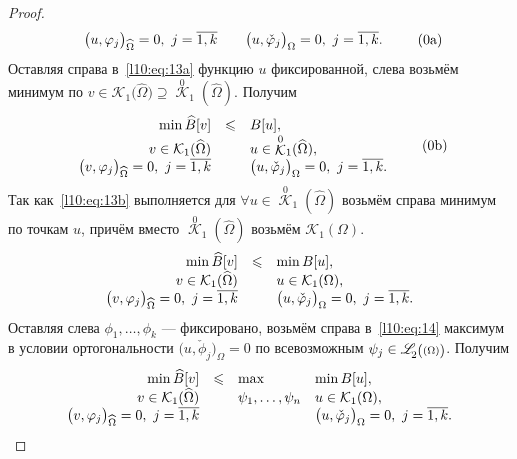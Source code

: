 \documentclass[12pt,a4paper,openany,fleqn]{book}
\newcommand{\mc}[1]{\ensuremath{\mathcal{#1}}}
\newcommand{\K}{\mc{K}}
\newcommand{\fLr}[1][{[a,b];\rho}]{\ensuremath{\mathscr{L}\hspace*{-0.11 cm}{\mathstrut}_{2}{\scriptstyle\left(\vphantom{A^b}#1\right)}}}
\theoremstyle{definition}
\begin{document}
\begin{proof}
\begin{equation}
\begin{array}{rcl}
				\big(u,\phi_j\big)_{\widehat{\Omega}}=0,\ j=\overline{1,k}&  &\big(u,\check{\phi}_j\big)_{\Omega}=0,\ j=\overline{1,k}.
			\end{array}\tag{\theequation a}\hfill
		\end{equation} 
		Оставляя справа в~\eqref{l10:eq:13a} функцию $u$ фиксированной, слева возьмём минимум по $v\in\K_1\big(\widehat{\Omega}\big)\supseteq{\mathop{\K}\limits^0}_1(\widehat{\Omega})$. Получим
		\begin{equation}\label{l10:eq:13b}
			\hfill\begin{array}{rcl}
				\min\widehat{B}[v]&\leqslant&B[u],\\
				v\in\K_1(\widehat{\Omega})& &u\in{\mathop{\K}\limits^0}_1(\widehat{\Omega}),\\
				\big(v,\phi_j\big)_{\widehat{\Omega}}=0,\ j=\overline{1,k}&  &\big(u,\check{\phi}_j\big)_{\Omega}=0,\ j=\overline{1,k}.
			\end{array}\tag{\theequation b}\hfill
		\end{equation} 
		Так как~\eqref{l10:eq:13b} выполняется для $\forall u\in{\mathop{\K}\limits^0}_1(\widehat{\Omega})$ возьмём справа минимум по точкам $u$, причём вместо ${\mathop{\K}\limits^0}_1(\widehat{\Omega})$ возьмём $\K_1(\Omega)$.
		\begin{equation}\label{l10:eq:14}
			\hfill\begin{array}{rcl}
				\min\widehat{B}[v]&\leqslant&\min B[u],\\
				v\in\K_1(\widehat{\Omega})& &u\in\K_1(\Omega),\\
				\big(v,\phi_j\big)_{\widehat{\Omega}}=0,\ j=\overline{1,k}&  &\big(u,\check{\phi}_j\big)_{\Omega}=0,\ j=\overline{1,k}.
			\end{array}\hfill
		\end{equation} 
		Оставляя слева $\phi_1,\ldots,\phi_k$ --- фиксировано, возьмём справа в~\eqref{l10:eq:14} максимум в условии ортогональности $\big(u,\check{\phi}_j\big)_{\Omega}=0$ по всевозможным $\psi_j\in\fLr[(\Omega)]$. Получим
		\begin{equation}\label{l10:eq:15}
			\hfill\begin{array}{rcll}
				\min\widehat{B}[v]&\leqslant&\max&\min B[u],\\
				v\in\K_1(\widehat{\Omega})&  &\psi_1,\ldots,\psi_n &u\in\K_1(\Omega),\\
				\big(v,\phi_j\big)_{\widehat{\Omega}}=0,\ j=\overline{1,k}& &   &\big(u,\check{\phi}_j\big)_{\Omega}=0,\ j=\overline{1,k}.
			\end{array}\hfill

\end{equation}
\end{proof}
\end{document}
